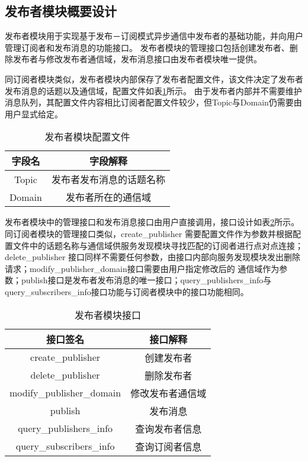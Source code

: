 
\subsection{发布者模块概要设计}
发布者模块用于实现基于发布－订阅模式异步通信中发布者的基础功能，并向用户管理订阅者和发布消息的功能接口。
发布者模块的管理接口包括创建发布者、删除发布者与修改发布者通信域，发布消息接口由发布者模块唯一提供。

同订阅者模块类似，发布者模块内部保存了发布者配置文件，该文件决定了发布者发布消息的话题以及通信域，配置文件如表\ref{publisher_config_file}所示。
由于发布者内部并不需要维护消息队列，其配置文件内容相比订阅者配置文件较少，但Topic与Domain仍需要由用户显式给定。
\begin{table}[htb]
  \centering\small
  \caption{发布者模块配置文件}
  \label{publisher_config_file}
  \begin{tabular}{cc}
    \toprule
    字段名 & 字段解释 \\
    \midrule
    Topic & 发布者发布消息的话题名称\\
    Domain & 发布者所在的通信域\\
    \bottomrule
  \end{tabular}
\end{table}

发布者模块中的管理接口和发布消息接口由用户直接调用，接口设计如表\ref{publisher_interface}所示。同订阅者模块的管理接口类似，create\_publisher
需要配置文件作为参数并根据配置文件中的话题名称与通信域供服务发现模块寻找匹配的订阅者进行点对点连接；delete\_publisher
接口同样不需要任何参数，由接口内部向服务发现模块发出删除请求；modify\_publisher\_domain接口需要由用户指定修改后的
通信域作为参数；publish接口是发布者发布消息的唯一接口；query\_publishers\_info与query\_subscribers\_info接口功能与订阅者模块中的接口功能相同。
\begin{table}[htb]
  \centering\small
  \renewcommand\arraystretch{1.2}
  \caption{发布者模块接口}
  \label{publisher_interface}
  \begin{tabular}{cc}
    \toprule
    接口签名 & 接口解释 \\
    \midrule
    create\_publisher & 创建发布者\\
    delete\_publisher & 删除发布者\\
    modify\_publisher\_domain & 修改发布者通信域\\
    publish & 发布消息 \\
    query\_publishers\_info & 查询发布者信息\\
    query\_subscribers\_info & 查询订阅者信息\\
    \bottomrule
  \end{tabular}
\end{table}

